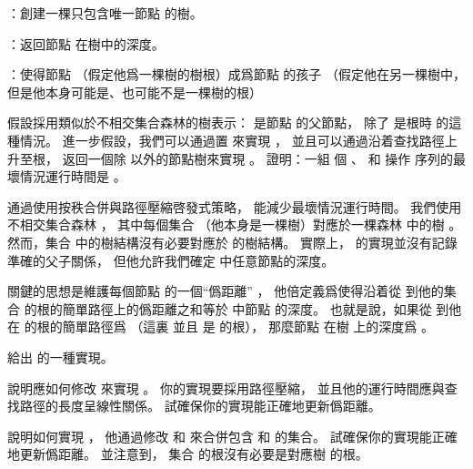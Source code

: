 ：創建一棵只包含唯一節點  的樹。

：返回節點  在樹中的深度。

：使得節點  （假定他爲一棵樹的樹根）成爲節點  的孩子
（假定他在另一棵樹中，但是他本身可能是、也可能不是一棵樹的根）

\startigBase[a]\startitem
假設採用類似於不相交集合森林的樹表示：
  是節點  的父節點，
除了  是根時  的這種情況。
進一步假設，我們可以通過置  來實現 ，
並且可以通過沿着查找路徑上升至根，
返回一個除  以外的節點樹來實現 。
證明：一組  個 、  和  操作
序列的最壞情況運行時間是 。
\stopitem\stopigBase

\startANSWER
{}
\stopANSWER

通過使用按秩合併與路徑壓縮啓發式策略，
能減少最壞情況運行時間。
我們使用不相交集合森林 ，
其中每個集合  （他本身是一棵樹）對應於一棵森林  中的樹 。
然而，集合  中的樹結構沒有必要對應於  的樹結構。
實際上，  的實現並沒有記錄準確的父子關係，
但他允許我們確定  中任意節點的深度。

關鍵的思想是維護每個節點  的一個“僞距離” ，
他倍定義爲使得沿着從  到他的集合  的根的簡單路徑上的僞距離之和等於  中節點  的深度。
也就是說，如果從  到他在  的根的簡單路徑爲 （這裏  並且  是  的根），
那麼節點  在樹  上的深度爲 。

\startigBase[continue]\startitem
給出  的一種實現。
\stopitem\stopigBase

\startANSWER
{}
\stopANSWER

\startigBase[continue]\startitem
說明應如何修改  來實現 。
你的實現要採用路徑壓縮，
並且他的運行時間應與查找路徑的長度呈線性關係。
試確保你的實現能正確地更新僞距離。
\stopitem\stopigBase

\startANSWER
{}
\stopANSWER

\startigBase[continue]\startitem
說明如何實現 ，
他通過修改  和  來合併包含  和  的集合。
試確保你的實現能正確地更新僞距離。
並注意到，
集合  的根沒有必要是對應樹  的根。
\stopitem\stopigBase

\startANSWER
{}
\stopANSWER

